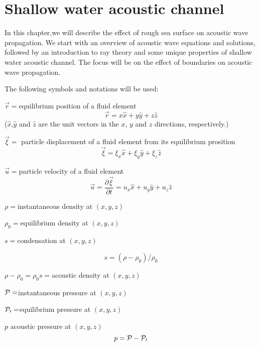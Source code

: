 
\chapter{Shallow water acoustic channel }

In this chapter,we will describe the effect of rough sea surface on
acoustic wave propagation. We start with an overview of acoustic
wave equations and solutions, followed by an introduction to ray
theory and some unique properties of shallow water acoustic channel.
The focus will be on the effect of boundaries on acoustic wave
propagation.

The following symbols and notations will be used:

$\vec{r}=$equilibrium position of a fluid element
\begin{equation}
\vec{r}=x\hat{x}+y\hat{y}+z\hat{z}
\end{equation}
($\hat{x}$,$\hat{y}$ and $\hat{z}$ are the unit vectors in the $x$,
$y$ and $z$ directions, respectively.)

$\vec{\xi}=$ particle displacement of a fluid element from its
equilibrium prosition
\begin{equation}
\vec{\xi}=\xi_{x}\hat{x}+\xi_{y}\hat{y}+\xi_{z}\hat{z}
\end{equation}

$\vec{u}=$particle velocity of a fluid element
\begin{equation}
\vec{u}=\frac{\partial{\vec{\xi}}}{\partial{t}}=u_x{\hat{x}}+u_y{\hat{y}}+u_z{\hat{z}}
\end{equation}

$\rho=$instantaneous density at $(x,y,z)$

$\rho_0=$equilibrium density at $(x,y,z)$

$s=$condensation at $(x,y,z)$

\begin{equation}
s=(\rho-\rho_0)/\rho_0
\end{equation}

$\rho-\rho_0=\rho_0s=$acoustic density at $(x,y,z)$

$\cal{P}=$instantaneous pressure at $(x,y,z)$

$\cal{P} _0=$equilibrium pressure at $(x,y,z)$

$p$ acoustic pressure at $(x,y,z)$
\begin{equation}
p=\cal{P}-\cal{P}_0
\end{equation}

